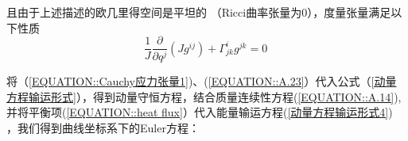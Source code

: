 \documentclass[LBMDerivation.tex]{subfiles}
\begin{document}
%
%

且由于上述描述的欧几里得空间是平坦的 （Ricci曲率张量为0），度量张量满足以下性质
\begin{equation}
  \frac{1}{J} \frac{\partial}{\partial q^{j}}\left(J g^{i j}\right)+\Gamma_{j k}^{i} g^{j k}=0
  \label{EQUATION::A.23} ~
\end{equation}
%
%

将（\ref{EQUATION::Cauchy应力张量1})、(\ref{EQUATION::A.23}）代入公式（\ref{动量方程输运形式}），得到动量守恒方程，结合质量连续性方程(\ref{EQUATION::A.14}), 并将平衡项(\ref{EQUATION::heat flux}）代入能量输运方程(\ref{动量方程输运形式4})
，我们得到曲线坐标系下的Euler方程：



\end{document}
